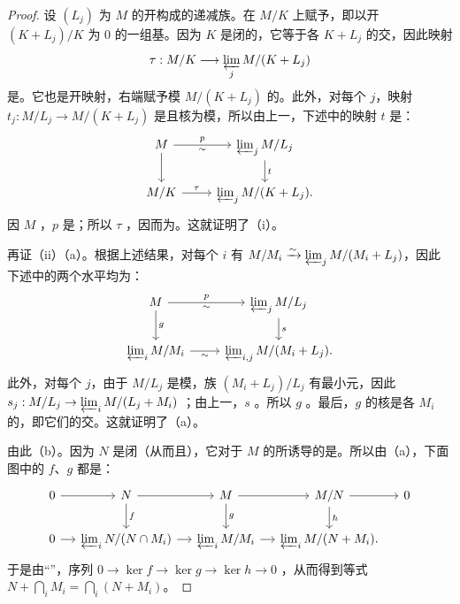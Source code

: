 \begin{proof}
设 $(L_j)$ 为 $M$ 的开构成的递减族。在 $M/K$ 上赋予，即以开 $(K+L_j)/K$ 为 $0$ 的一组基。因为 $K$ 是闭的，它等于各 $K+L_j$ 的交，因此映射
\[\tau:M/K\longrightarrow\varprojlim_jM/(K+L_j)\]
是。它也是开映射，右端赋予模 $M/(K+L_j)$ 的。此外，对每个 $j$，映射 $t_j:M/L_j\to M/(K+L_j)$ 是且核为模，所以由上一，下述中的映射 $t$ 是：
\[
\begin{tikzcd}
 M\arrow[r,"p","\sim"']\arrow[d]&\varprojlim_j M/L_j\arrow[d,"t"]\\
 M/K\arrow[r,"\tau"]&\varprojlim_jM/(K+L_j).
\end{tikzcd}
\]
因 $M$ ，$p$ 是；所以 $\tau$ ，因而为。这就证明了（i）。

再证（ii）（a）。根据上述结果，对每个 $i$ 有 $M/M_i\xrightarrow{\sim}\varprojlim_jM/(M_i+L_j)$，因此下述中的两个水平均为：
\[
\begin{tikzcd}
 M\arrow[r,"p","\sim"']\arrow[d,"g"]&\varprojlim_jM/L_j\arrow[d,"s"]\\
 \varprojlim_iM/M_i\arrow[r,"\sim"']&\varprojlim_{i,j}M/(M_i+L_j).
\end{tikzcd}
\]
此外，对每个 $j$，由于 $M/L_j$ 是模，族 $(M_i+L_j)/L_j$ 有最小元，因此 $s_j:M/L_j\to\varprojlim_iM/(L_j+M_i)$ ；由上一，$s$ 。所以 $g$ 。最后，$g$ 的核是各 $M_i$ 的，即它们的交。这就证明了（a）。

由此（b）。因为 $N$ 是闭（从而且），它对于 $M$ 的所诱导的是。所以由（a），下面图中的 $f$、$g$ 都是：
\[
\begin{tikzcd}[column sep=small]
0\arrow[r]&N\arrow[r]\arrow[d,"f"]&M\arrow[r]\arrow[d,"g"]&M/N\arrow[r]\arrow[d,"h"]&0\\
0\arrow[r]&\varprojlim_iN/(N\cap M_i)\arrow[r]&\varprojlim_iM/M_i\arrow[r]&\varprojlim_iM/(N+M_i).
\end{tikzcd}
\]
于是由“”，序列 $0\to\ker f\to\ker g\to\ker h\to0$ ，从而得到等式 $N+\bigcap_iM_i=\bigcap_i(N+M_i)$。
\end{proof}
